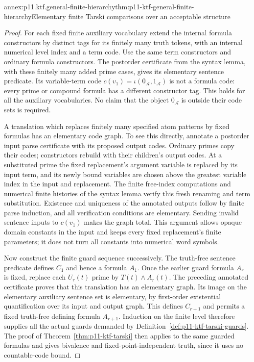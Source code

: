 \begin{annexitem}{annex:p11.ktf.general-finite-hierarchy}{thm:p11-ktf-general-finite-hierarchy}{Elementary finite Tarski comparisons over an acceptable structure}
\begin{proof}
For each fixed finite auxiliary vocabulary extend the internal
formula constructors by distinct tags for its finitely many truth
tokens, with an internal numerical level index and a term code.
Use the same term constructors and ordinary formula constructors.
The postorder certificate from the syntax lemma, with these finitely
many added prime cases, gives its elementary sentence predicate.
Its variable-term code \(c(v_1)=\iota(0_{\mathcal A},1_{\mathcal A})\)
is not a formula code: every prime or compound formula has a
different constructor tag. This holds for all the auxiliary vocabularies.
No claim that the object \(0_{\mathcal A}\) is outside
their code sets is required.

A translation which replaces finitely many specified atom patterns
by fixed formulas has an elementary code graph. To see this directly,
annotate a postorder input parse certificate with its proposed output
codes. Ordinary primes copy their codes; constructors rebuild with
their children's output codes. At a substituted prime the fixed
replacement's argument variable is replaced by its input term,
and its newly bound variables are chosen above the greatest variable
index in the input and replacement. The finite free-index computations
and numerical finite histories of the syntax lemma verify this
fresh renaming and term substitution. Existence and uniqueness of
the annotated outputs follow by finite parse induction, and all
verification conditions are elementary. Sending invalid sentence
inputs to \(c(v_1)\) makes the graph total. This argument
allows opaque domain constants in the input and keeps every fixed
replacement's finite parameters; it does not turn all constants
into numerical word symbols.

Now construct the finite guard sequence successively. The truth-free
sentence predicate defines \(C_1\) and hence a formula \(A_1\).
Once the earlier guard formula \(A_r\) is fixed, replace
each \(U_r(t)\) prime by \(T(t)\land A_r(t)\).
The preceding annotated certificate proves that this translation
has an elementary graph. Its image on the elementary auxiliary
sentence set is elementary, by first-order existential quantification
over its input and output graph. This defines \(C_{r+1}\)
and permits a fixed truth-free defining formula \(A_{r+1}\).
Induction on the finite level therefore supplies all the actual
guards demanded by Definition~\ref{def:p11-ktf-tarski-guards}.
The proof of Theorem~\ref{thm:p11-ktf-tarski} then applies to
the same guarded formulas and gives bivalence and fixed-point-independent
truth, since it uses no countable-code bound.


\end{proof}
\end{annexitem}
